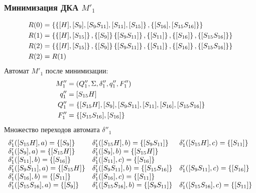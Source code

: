 \subsubsection{Минимизация ДКА \(M'_1\)}
\begin{align*}
	R(0) & = \left\{\left\{[H], [S_9], [S_9S_{11}],[S_{11}], [S_{15}]\right\}, \left\{[S_{16}], [S_{15}S_{16}]\right\} \right\}                        \\
	R(1) & = \left\{\left\{[H], [S_{15}]\right\}, \left\{[S_9]\right\} \left\{[S_9S_{11}]\right\},\left\{[S_{11}]\right\}, \left\{[S_{16}]\right\}, \left\{[S_{15}S_{16}]\right\} \right\} \\
	R(2) & = \left\{\left\{[H], [S_{15}]\right\}, \left\{[S_9]\right\} \left\{[S_9S_{11}]\right\},\left\{[S_{11}]\right\}, \left\{[S_{16}]\right\}, \left\{[S_{15}S_{16}]\right\} \right\} \\
	R(2) & = R(1)
\end{align*}
Автомат \(M'_1\) после минимизации:
\begin{align*}
	M''_1 & = \left(Q''_1, \Sigma, \delta''_1, q''_1, F''_1\right)                          \\
	q''_1 & = [S_{15}H]                                                              \\
	Q''_1 & = \left\{[S_{15}H], [S_9], [S_9S_{11}],[S_{11}], [S_{16}], [S_{15}S_{16}]\right\} \\
	F''_1 & = \left\{[S_{15}S_{16}], [S_{16}]\right\}
\end{align*}
Множество переходов автомата \(\delta''_1\)
\begin{align*}
	\begin{array}{lll}
		\delta'_1([S_{15}H], a) = \left\{[S_9]\right\}       & \delta'_1([S_{15}H], b) = \left\{[S_9S_{11}]\right\}      & \delta'_1([S_{15}H], c) = \left\{[S_{11}]\right\}      \\
		\delta'_1([S_9], a) = \left\{[S_{15}H]\right\}       & \delta'_1([S_9], b) = \left\{[S_{15}H]\right\}                                                            \\
		\delta'_1([S_{11}], b) = \left\{[S_{16}]\right\}     & \delta'_1([S_{11}], c) = \left\{[S_{16}]\right\}                                                          \\
		\delta'_1([S_9S_{11}], a) = \left\{[S_{15}H]\right\} & \delta'_1([S_9S_{11}], b) = \left\{[S_{15}S_{16}]\right\} & \delta'_1([S_9S_{11}], c) = \left\{[S_{16}]\right\}    \\
		\delta'_1([S_{16}], b) = \left\{[S_{11}]\right\}     & \delta'_1([S_{16}], c) = \left\{[S_{11}]\right\}                                                          \\
		\delta'_1([S_{15}S_{16}], a) = \left\{[S_9]\right\}  & \delta'_1([S_{15}S_{16}], b) = \left\{[S_9S_{11}]\right\} & \delta'_1([S_{15}S_{16}], c) = \left\{[S_{11}]\right\} \\
	\end{array}
\end{align*}
